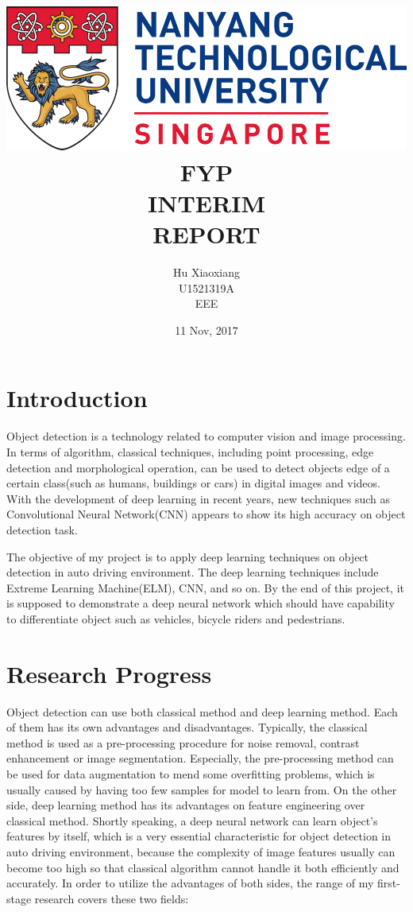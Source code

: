 \documentclass[titlepage]{article}
\author{Hu Xiaoxiang \\
U1521319A \\
EEE \\
}
\date{11 Nov, 2017 \\
}
\title{\includegraphics[width=\textwidth]{logo_ntu_new.png} \\
[5\baselineskip] FYP \\
INTERIM \\
REPORT \\
[5\baselineskip]}
\begin{document}
\maketitle
\tableofcontents

\newpage
{}

\section{Introduction}
\label{sec:org4837838}
Object detection is a technology related to computer vision and image
processing. In terms of algorithm, classical techniques, including point
processing, edge detection and morphological operation, can be used to detect
objects edge of a certain class(such as humans, buildings or cars) in digital
images and videos. With the development of deep learning in recent years, new
techniques such as Convolutional Neural Network(CNN) appears to show its high
accuracy on object detection task.

The objective of my project is to apply deep learning techniques on object
detection in auto driving environment. The deep learning techniques include
Extreme Learning Machine(ELM), CNN, and so on. By the end of this project, it
is supposed to demonstrate a deep neural network which should have capability
to differentiate object such as vehicles, bicycle riders and pedestrians.

\section{Research Progress}
\label{sec:org1bc5191}
Object detection can use both classical method and deep learning method. Each
of them has its own advantages and disadvantages. Typically, the classical
method is used as a pre-processing procedure for noise removal, contrast
enhancement or image segmentation. Especially, the pre-processing method can
be used for data augmentation to mend some overfitting problems, which is
usually caused by having too few samples for model to learn from. On the other
side, deep learning method has its advantages on feature engineering over
classical method. Shortly speaking, a deep neural network can learn object's
features by itself, which is a very essential characteristic for object
detection in auto driving environment, because the complexity of image
features usually can become too high so that classical algorithm cannot handle
it both efficiently and accurately. In order to utilize the advantages of both
sides, the range of my first-stage research covers these two fields:
\end{document}
